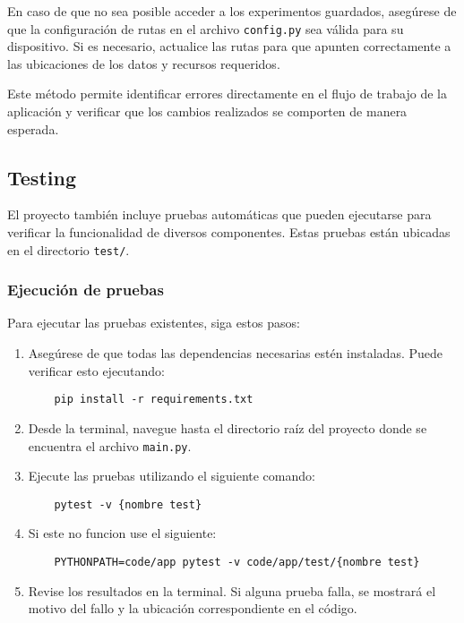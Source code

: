 En caso de que no sea posible acceder a los experimentos guardados, asegúrese de que la configuración de rutas en el archivo \texttt{config.py} sea válida para su dispositivo. Si es necesario, actualice las rutas para que apunten correctamente a las ubicaciones de los datos y recursos requeridos.

Este método permite identificar errores directamente en el flujo de trabajo de la aplicación y verificar que los cambios realizados se comporten de manera esperada.

\subsection{Testing}

El proyecto también incluye pruebas automáticas que pueden ejecutarse para verificar la funcionalidad de diversos componentes. Estas pruebas están ubicadas en el directorio \texttt{test/}.

\subsubsection{Ejecución de pruebas}

Para ejecutar las pruebas existentes, siga estos pasos:
\begin{enumerate}
    \item Asegúrese de que todas las dependencias necesarias estén instaladas. Puede verificar esto ejecutando:
    \begin{verbatim}
    pip install -r requirements.txt
    \end{verbatim}
    \item Desde la terminal, navegue hasta el directorio raíz del proyecto donde se encuentra el archivo \texttt{main.py}.
    \item Ejecute las pruebas utilizando el siguiente comando:
    \begin{verbatim}
    pytest -v {nombre test}
    \end{verbatim}
    \item Si este no funcion use el siguiente: 
    \begin{verbatim}
    PYTHONPATH=code/app pytest -v code/app/test/{nombre test}
    \end{verbatim}
    \item Revise los resultados en la terminal. Si alguna prueba falla, se mostrará el motivo del fallo y la ubicación correspondiente en el código.
\end{enumerate}


